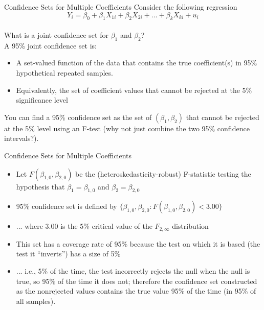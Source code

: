 \documentclass[notes,10pt, aspectratio=169]{beamer}
\begin{document}
\begin{frame}{Confidence Sets for Multiple Coefficients}
Consider the following regression
\begin{equation*}
    Y_i = \beta_0 + \beta_1 X_{1i} + \beta_2 X_{2i} + \dots  + \beta_k X_{ki} + u_i
\end{equation*}\\[1em]

What is a joint confidence set for $\beta_1$ and $\beta_2$?\\[1em]

A 95\% joint confidence set is:
\begin{itemize}
    \item A set-valued function of the data that contains the true coefficient(s) in 95\% hypothetical repeated samples.
    \item Equivalently, the set of coefficient values that cannot be rejected at the 5\% significance level
\end{itemize}

You can find a 95\% confidence set as the set of $(\beta_1, \beta_2)$ that cannot be rejected at the 5\% level using an F-test (why not just combine the two 95\% confidence intervals?).

\end{frame}


\begin{frame}{Confidence Sets for Multiple Coefficients}
\begin{itemize}
    \item Let $F(\beta_{1,0}, \beta_{2,0})$ be the (heteroskedasticity-robust) F-statistic testing the hypothesis that $\beta_{1}=\beta_{1,0}$ and $\beta_{2}=\beta_{2,0}$\\[1em]
    \item 95\% confidence set is defined by $\{\beta_{1,0}, \beta_{2,0}: F(\beta_{1,0}, \beta_{2,0})<3.00\}$\\[1em]
    \item ... where 3.00 is the 5\% critical value of the $F_{2, \infty}$ distribution\\[1em]
    \item This set has a coverage rate of 95\% because the test on which it is based (the test it “inverts”) has a size of 5\%\\[1em]
    \item ... i.e., 5\% of the time, the test incorrectly rejects the null when the null is true, so 95\% of the time it does not; therefore the confidence set constructed as the nonrejected values contains the true value 95\% of the time (in 95\% of all samples).
\end{itemize}
\end{frame}
\end{document}
